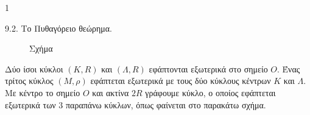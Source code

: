 \begin{ylh}{1}
    \item 9.2. Το Πυθαγόρειο θεώρημα.
\end{ylh}
\begin{figure}
\centering
{}
\caption*{Σχήμα}
\end{figure}

Δύο ίσοι κύκλοι $(K,R)$ και $(\Lambda,R)$ εφάπτονται εξωτερικά στο σημείο $O$. Ένας τρίτος κύκλος $(M,\rho)$ εφάπτεται εξωτερικά με τους δύο κύκλους κέντρων $K$ και $\Lambda$. Με κέντρο το σημείο $O$ και ακτίνα $2R$ γράφουμε κύκλο, ο οποίος εφάπτεται εξωτερικά των $3$ παραπάνω κύκλων, όπως φαίνεται στο παρακάτω σχήμα.

